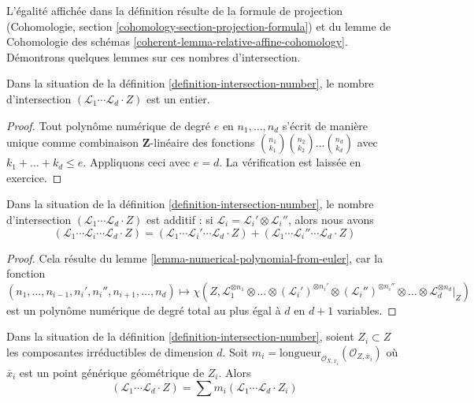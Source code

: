 \noindent
L'égalité affichée dans la définition résulte de
la formule de projection
(Cohomologie, section \ref{cohomology-section-projection-formula}) et du
lemme de Cohomologie des schémas
\ref{coherent-lemma-relative-affine-cohomology}.
Démontrons quelques lemmes sur ces nombres d'intersection.

\begin{lemma}
\label{lemma-intersection-number-integer}
Dans la situation de la définition \ref{definition-intersection-number},
le nombre d'intersection
$(\mathcal{L}_1 \cdots \mathcal{L}_d \cdot Z)$
est un entier.
\end{lemma}

\begin{proof}
Tout polynôme numérique de degré $e$ en $n_1, \ldots, n_d$ s'écrit
de manière unique comme combinaison $\mathbf{Z}$-linéaire des fonctions
${n_1 \choose k_1}{n_2 \choose k_2} \ldots {n_d \choose k_d}$ avec
$k_1 + \ldots + k_d \leq e$. Appliquons ceci avec $e = d$.
La vérification est laissée en exercice.
\end{proof}

\begin{lemma}
\label{lemma-intersection-number-additive}
Dans la situation de la définition \ref{definition-intersection-number},
le nombre d'intersection
$(\mathcal{L}_1 \cdots \mathcal{L}_d \cdot Z)$
est additif : si $\mathcal{L}_i = \mathcal{L}_i' \otimes \mathcal{L}_i''$,
alors nous avons
$$
(\mathcal{L}_1 \cdots \mathcal{L}_i \cdots \mathcal{L}_d \cdot Z) =
(\mathcal{L}_1 \cdots \mathcal{L}_i' \cdots \mathcal{L}_d \cdot Z) +
(\mathcal{L}_1 \cdots \mathcal{L}_i'' \cdots \mathcal{L}_d \cdot Z)
$$
\end{lemma}

\begin{proof}
Cela résulte du lemme \ref{lemma-numerical-polynomial-from-euler}, car
la fonction
$$
(n_1, \ldots, n_{i - 1}, n_i', n_i'', n_{i + 1}, \ldots, n_d)
\mapsto
\chi(Z, \mathcal{L}_1^{\otimes n_1} \otimes
\ldots \otimes (\mathcal{L}_i')^{\otimes n_i'} \otimes
(\mathcal{L}_i'')^{\otimes n_i''} \otimes \ldots \otimes
\mathcal{L}_d^{\otimes n_d}|_Z)
$$
est un polynôme numérique de degré total au plus égal à $d$ en $d + 1$ variables.
\end{proof}

\begin{lemma}
\label{lemma-intersection-number-in-terms-of-components}
Dans la situation de la définition \ref{definition-intersection-number},
soient $Z_i \subset Z$ les composantes irréductibles de dimension $d$. Soit
$m_i = \text{longueur}_{\mathcal{O}_{X, \overline{x}_i}}
(\mathcal{O}_{Z, \overline{x}_i})$
où $\overline{x}_i$ est un point générique géométrique de $Z_i$. Alors
$$
(\mathcal{L}_1 \cdots \mathcal{L}_d \cdot Z) =
\sum m_i(\mathcal{L}_1 \cdots \mathcal{L}_d \cdot Z_i)
$$
\end{lemma}

